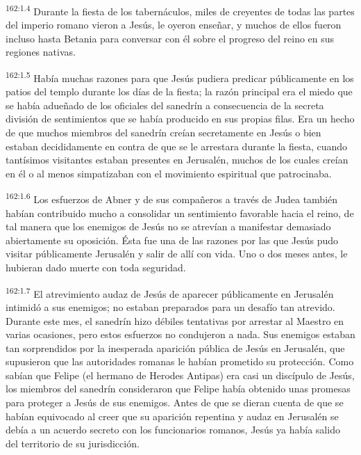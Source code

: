 \par
\textsuperscript{162:1.4} Durante la fiesta de los tabernáculos, miles de creyentes de todas las partes del imperio romano vieron a Jesús, le oyeron enseñar, y muchos de ellos fueron incluso hasta Betania para conversar con él sobre el progreso del reino en sus regiones nativas.

\par
\textsuperscript{162:1.5} Había muchas razones para que Jesús pudiera predicar públicamente en los patios del templo durante los días de la fiesta; la razón principal era el miedo que se había adueñado de los oficiales del sanedrín a consecuencia de la secreta división de sentimientos que se había producido en sus propias filas. Era un hecho de que muchos miembros del sanedrín creían secretamente en Jesús o bien estaban decididamente en contra de que se le arrestara durante la fiesta, cuando tantísimos visitantes estaban presentes en Jerusalén, muchos de los cuales creían en él o al menos simpatizaban con el movimiento espiritual que patrocinaba.

\par
\textsuperscript{162:1.6} Los esfuerzos de Abner y de sus compañeros a través de Judea también habían contribuido mucho a consolidar un sentimiento favorable hacia el reino, de tal manera que los enemigos de Jesús no se atrevían a manifestar demasiado abiertamente su oposición. Ésta fue una de las razones por las que Jesús pudo visitar públicamente Jerusalén y salir de allí con vida. Uno o dos meses antes, le hubieran dado muerte con toda seguridad.

\par
\textsuperscript{162:1.7} El atrevimiento audaz de Jesús de aparecer públicamente en Jerusalén intimidó a sus enemigos; no estaban preparados para un desafío tan atrevido. Durante este mes, el sanedrín hizo débiles tentativas por arrestar al Maestro en varias ocasiones, pero estos esfuerzos no condujeron a nada. Sus enemigos estaban tan sorprendidos por la inesperada aparición pública de Jesús en Jerusalén, que supusieron que las autoridades romanas le habían prometido su protección. Como sabían que Felipe (el hermano de Herodes Antipas) era casi un discípulo de Jesús, los miembros del sanedrín consideraron que Felipe había obtenido unas promesas para proteger a Jesús de sus enemigos. Antes de que se dieran cuenta de que se habían equivocado al creer que su aparición repentina y audaz en Jerusalén se debía a un acuerdo secreto con los funcionarios romanos, Jesús ya había salido del territorio de su jurisdicción.

